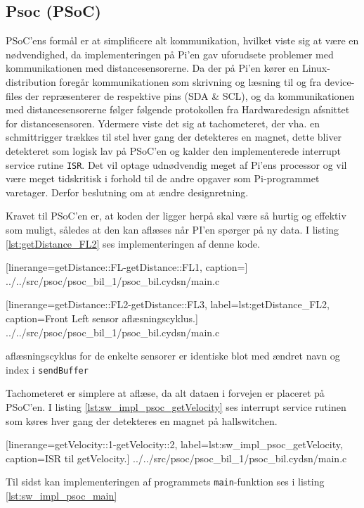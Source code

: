 \subsection{Psoc (PSoC)} \label{sub:sw_impl_psoc_psoc}

PSoC'ens formål er at simplificere alt \IIC kommunikation, hvilket viste sig at være en nødvendighed, da implementeringen på Pi'en gav uforudsete problemer med kommunikationen med distancesensorerne.
Da der på Pi'en kører en Linux-distribution foregår \IIC kommunikationen som skrivning og læsning til og fra device-files der repræsenterer de respektive pins (SDA \& SCL), og da kommunikationen med distancesensorerne følger følgende protokollen fra Hardwaredesign afsnittet for distancesensoren.
Ydermere viste det sig at tachometeret, der vha. en schmittrigger trækkes til stel hver gang der detekteres en magnet, dette bliver detekteret som logisk lav på PSoC'en og  kalder den implementerede interrupt service rutine \texttt{ISR}. 
Det vil optage udnødvendig meget af Pi'ens processor og vil være meget tidskritisk i forhold til de andre opgaver som Pi-programmet varetager. Derfor beslutning om at ændre designretning.

Kravet til PSoC'en er, at koden der ligger herpå skal være så hurtig og effektiv som muligt, således at den kan aflæses når PI'en spørger på ny data. 
I listing \ref{lst:getDistance_FL2} ses implementeringen af denne kode.


	[linerange=getDistance::FL-getDistance::FL1, caption=]
	{../../src/psoc/psoc_bil_1/psoc_bil.cydsn/main.c}


	[linerange=getDistance::FL2-getDistance::FL3, label=lst:getDistance_FL2, caption=Front Left sensor aflæsningscyklus.]
	{../../src/psoc/psoc_bil_1/psoc_bil.cydsn/main.c}
	
aflæsningscyklus for de enkelte sensorer er identiske blot med ændret navn og index i \texttt{sendBuffer}

Tachometeret er simplere at aflæse, da alt dataen i forvejen er placeret på PSoC'en. I listing \ref{lst:sw_impl_psoc_getVelocity} ses interrupt service rutinen som køres hver gang der detekteres en magnet på hallswitchen.


	[linerange=getVelocity::1-getVelocity::2, label=lst:sw_impl_psoc_getVelocity, caption=ISR til getVelocity.]
	{../../src/psoc/psoc_bil_1/psoc_bil.cydsn/main.c}

Til sidst kan implementeringen af programmets \texttt{main}-funktion ses i listing \ref{lst:sw_impl_psoc_main}



\clearpage
